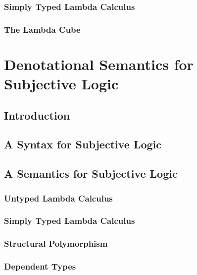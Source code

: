 \documentclass[a4paper]{report}
\begin{document}
\subsection{Simply Typed Lambda Calculus}

\subsection{The Lambda Cube}






\chapter{Denotational Semantics for Subjective Logic}
\label{chap:denotational-semantics}

\section{Introduction}

\section{A Syntax for Subjective Logic}

\section{A Semantics for Subjective Logic}

\subsection{Untyped Lambda Calculus}      %

\subsection{Simply Typed Lambda Calculus} %

\subsection{Structural Polymorphism}      %

\subsection{Dependent Types}             %
\end{document}
